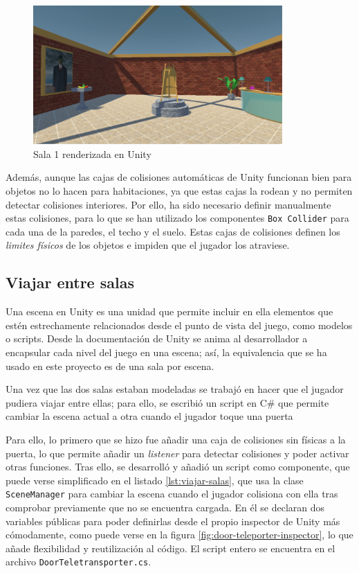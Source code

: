 \begin{figure}[!h]
\begin{center}
\includegraphics[width=0.85\textwidth]{imagenes/7/salas-unity/unity-sala-1.png}
\caption{Sala 1 renderizada en Unity}
\label{fig:unity-sala-1}
\end{center}
\end{figure}

Además, aunque las cajas de colisiones automáticas de Unity funcionan bien para objetos no lo hacen para habitaciones, ya que estas cajas la rodean y no permiten detectar colisiones interiores. Por ello, ha sido necesario definir manualmente estas colisiones, para lo que se han utilizado los componentes \texttt{Box Collider} para cada una de la paredes, el techo y el suelo. Estas cajas de colisiones definen los \textit{limites físicos} de los objetos e impiden que el jugador los atraviese.

\subsection{Viajar entre salas}

Una escena en Unity es una unidad que permite incluir en ella elementos que estén estrechamente relacionados desde el punto de vista del juego, como modelos o scripts. Desde la documentación de Unity se anima al desarrollador a encapsular cada nivel del juego en una escena; así, la equivalencia que se ha usado en este proyecto es de una sala por escena.

Una vez que las dos salas estaban modeladas se trabajó en hacer que el jugador pudiera viajar entre ellas; para ello, se escribió un script en C\# que permite cambiar la escena actual a otra cuando el jugador toque una puerta 

Para ello, lo primero que se hizo fue añadir una caja de colisiones sin físicas a la puerta, lo que permite añadir un \textit{listener} para detectar colisiones y poder activar otras funciones. Tras ello, se desarrolló y añadió un script como componente, que puede verse simplificado en el listado \ref{lst:viajar-salas}, que usa la clase \texttt{SceneManager} para cambiar la escena cuando el jugador colisiona con ella tras comprobar previamente que no se encuentra cargada. En él se declaran dos variables públicas para poder definirlas desde el propio inspector de Unity más cómodamente, como puede verse en la figura \ref{fig:door-teleporter-inspector}, lo que añade flexibilidad y reutilización al código. El script entero se encuentra en el archivo \texttt{DoorTeletransporter.cs}.

